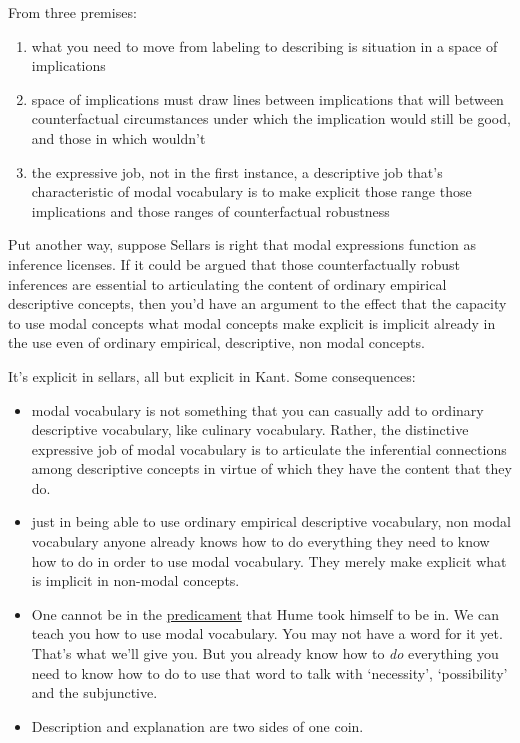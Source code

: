 From three premises:
\begin{enumerate}
\item what you need to move from labeling to describing is situation in a space of implications
\item space of implications must draw lines between implications that will between counterfactual circumstances under which the implication would still be good, and those in which wouldn't
\item the expressive job, not in the first instance, a descriptive job that's characteristic of modal vocabulary is to make explicit those range those implications and those ranges of counterfactual robustness
\end{enumerate}

Put another way, suppose Sellars is right that modal expressions function as inference licenses. If it could be argued that those counterfactually robust inferences are essential to articulating the content of ordinary empirical descriptive concepts, then you'd have an argument to the effect that the capacity to use modal concepts what modal concepts make explicit is implicit already in the use even of ordinary empirical, descriptive, non modal concepts.

It's explicit in sellars, all but explicit in Kant. Some consequences:
\begin{itemize}

    \item modal vocabulary is not something that you can casually add to ordinary descriptive vocabulary, like culinary vocabulary. Rather, the distinctive expressive job of modal vocabulary is to articulate the inferential connections among descriptive concepts in virtue of which they have the content that they do.

    \item just in being able to use ordinary empirical descriptive vocabulary, non modal vocabulary anyone already knows how to do everything they need to know how to do in order to use modal vocabulary. They merely make explicit what is implicit in non-modal concepts.

    \item One cannot be in the \href{doc/phil/People/Hume/Predicament}{predicament} that Hume took himself to be in. We can teach you how to use modal vocabulary. You may not have a word for it yet. That's what we'll give you. But you already know how to \emph{do} everything you need to know how to do to use that word to talk with `necessity', `possibility' and the subjunctive.

    \item Description and explanation are two sides of one coin.
\end{itemize}

